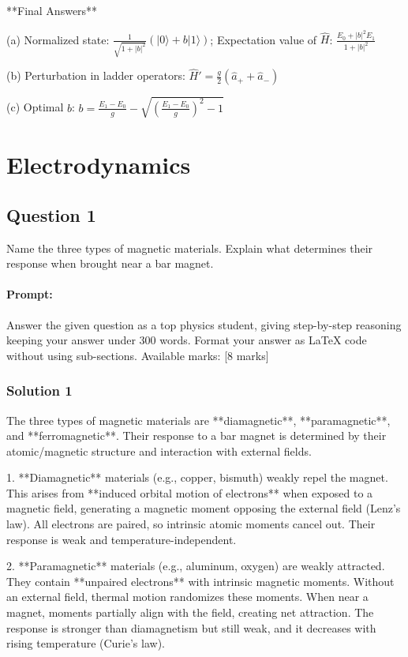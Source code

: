 \documentclass{article}
\begin{document}
**Final Answers**

(a) Normalized state: \(\frac{1}{\sqrt{1 + |b|^2}}(|0\rangle + b|1\rangle)\); Expectation value of \(\hat{H}\): \(\boxed{\frac{E_0 + |b|^2E_1}{1 + |b|^2}}\)  

(b) Perturbation in ladder operators: \(\boxed{\hat{H}' = \frac{g}{2}(\hat{a}_+ + \hat{a}_-)}\)  

(c) Optimal \(b\): \(\boxed{b = \frac{E_1 - E_0}{g} - \sqrt{\left(\frac{E_1 - E_0}{g}\right)^2 - 1}}\)

\section{Electrodynamics}


\subsection{Question 1}

Name the three types of magnetic materials. Explain what determines their response when brought near a bar magnet. 

\paragraph{Prompt: \\} 
Answer the given question as a top physics student, giving step-by-step reasoning keeping your answer under 300 words. Format your answer as LaTeX code without using sub-sections. Available marks: [8 marks]

\subsubsection{Solution 1}
The three types of magnetic materials are **diamagnetic**, **paramagnetic**, and **ferromagnetic**. Their response to a bar magnet is determined by their atomic/magnetic structure and interaction with external fields.  

1. **Diamagnetic** materials (e.g., copper, bismuth) weakly repel the magnet. This arises from **induced orbital motion of electrons** when exposed to a magnetic field, generating a magnetic moment opposing the external field (Lenz's law). All electrons are paired, so intrinsic atomic moments cancel out. Their response is weak and temperature-independent.  

2. **Paramagnetic** materials (e.g., aluminum, oxygen) are weakly attracted. They contain **unpaired electrons** with intrinsic magnetic moments. Without an external field, thermal motion randomizes these moments. When near a magnet, moments partially align with the field, creating net attraction. The response is stronger than diamagnetism but still weak, and it decreases with rising temperature (Curie's law).  
\end{document}
